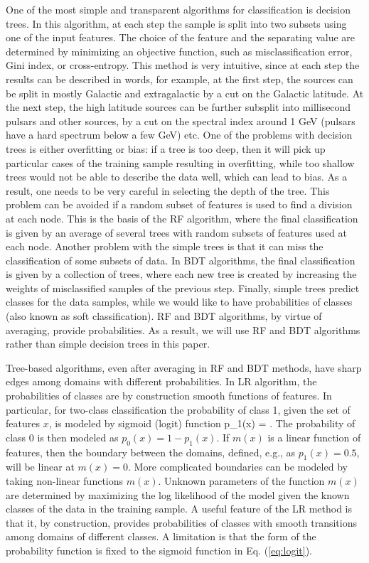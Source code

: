One of the most simple and transparent algorithms for classification is decision trees.
In this algorithm, at each step the sample is split into two subsets using one of the input features.
The choice of the feature and the separating value are determined by minimizing an objective function, such as misclassification
error, Gini index, or cross-entropy.
This method is very intuitive, since at each step the results can be described in words, 
for example, at the first step, the sources can be split in mostly Galactic and extragalactic by a cut on the Galactic latitude.
At the next step, the high latitude sources can be further subsplit into millisecond pulsars and other sources, by a cut on the spectral index around 1 GeV (pulsars have a hard spectrum below a few GeV) etc.
One of the problems with decision trees is either overfitting or bias: if a tree is too deep, then it will pick up particular cases of the training sample resulting in overfitting, while too shallow trees would not be able to describe the data well, which can lead to bias. 
As a result, one needs to be very careful in selecting the depth of the tree.
This problem can be avoided if a random subset of features is used to find a division at each node. This is the basis of the RF algorithm,
where the final classification is given by an average of several trees with random subsets of features used at each node.
Another problem with the simple trees is that it can miss the classification of some subsets of data. In BDT algorithms, the final classification is given by a collection of trees, where each new tree is created by increasing the weights of misclassified samples of the previous step. 
Finally, simple trees predict classes for the data samples, while we would like to have probabilities of classes (also known as soft classification).
RF and BDT algorithms, by virtue of averaging, provide probabilities. As a result, we will use RF and BDT algorithms rather than simple decision trees in this paper.

Tree-based algorithms, even after averaging in RF and BDT methods, have sharp edges among domains with different probabilities.
In LR algorithm, the probabilities of classes are by construction smooth functions of features.
In particular, for two-class classification the probability of class 1, given the set of features $x$, is modeled by sigmoid (logit) function
\bea
{}
p_1(x) = .
\eea
The probability of class 0 is then modeled as $p_0(x) = 1 - p_1(x)$.
If $m(x)$ is a linear function of features, then the boundary between the domains, defined, e.g., as $p_1(x) = 0.5$, will be linear
at $m(x) = 0$.
More complicated boundaries can be modeled by taking non-linear functions $m(x)$.
Unknown parameters of the function $m(x)$ are determined by maximizing the log likelihood of the model given the known classes of the data in the training sample.
A useful feature of the LR method is that it, by construction, provides probabilities of classes with smooth transitions among domains of different classes.
A limitation is that the form of the probability function is fixed to the sigmoid function in Eq. (\ref{eq:logit}).

